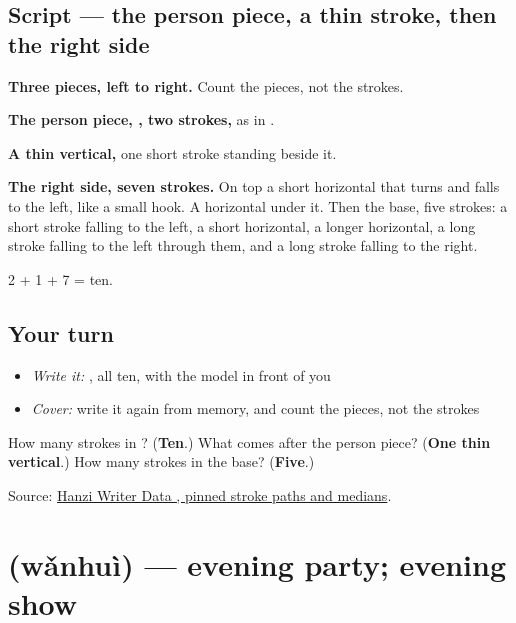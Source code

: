 \subsection*{Script — the person piece, a thin stroke, then the right side}

\begin{quote}
\end{quote}

\textbf{Three pieces, left to right.} Count the pieces, not the strokes.

\textbf{The person piece, , two strokes,} as in .

\textbf{A thin vertical,} one short stroke standing beside it.

\textbf{The right side, seven strokes.} On top a short horizontal that turns and falls to the left, like a small hook. A horizontal under it. Then the base, five strokes: a short stroke falling to the left, a short horizontal, a longer horizontal, a long stroke falling to the left through them, and a long stroke falling to the right.

2 + 1 + 7 = ten.

\subsection*{Your turn}
\begin{itemize}
\raggedright
  \item \emph{Write it:} , all ten, with the model in front of you
  \item \emph{Cover:} write it again from memory, and count the pieces, not the strokes
\end{itemize}

\begin{tcolorbox}[breakable,colback=teal!4,colframe=teal!35!black,title={Before you move on}]
How many strokes in ? (\textbf{Ten}.) What comes after the person piece? (\textbf{One thin vertical}.) How many strokes in the base? (\textbf{Five}.)

Source: \href{https://raw.githubusercontent.com/chanind/hanzi-writer-data/68d10a4b21150cae5e1ebbd223eed289cf32d90c/data/\%E5\%80\%99.json}{Hanzi Writer Data , pinned stroke paths and medians}.
\end{tcolorbox}
\section[\texorpdfstring{\zh{晚会} (wǎnhuì)}{晚会 (wǎnhuì)}]{ (wǎnhuì) — evening party; evening show}

